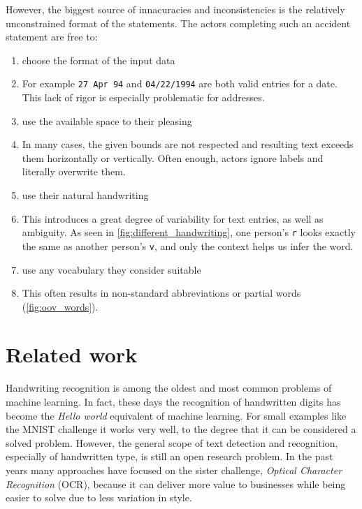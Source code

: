 	However, the biggest source of innacuracies and inconsistencies is the relatively unconstrained format of the statements. The actors completing such an accident statement are free to:
	\begin{enumerate}
		\item choose the format of the input data
		\item[] For example \texttt{27 Apr 94} and \texttt{04/22/1994} are both valid entries for a date. This lack of rigor is especially problematic for addresses.

		\item use the available space to their pleasing
		\item[] In many cases, the given bounds are not respected and resulting text exceeds them horizontally or vertically. Often enough, actors ignore labels and literally overwrite them.

		\item{use their natural handwriting \label{itm:natural_handwriting}}
		\item[] This introduces a great degree of variability for text entries, as well as ambiguity. As seen in \autoref{fig:different_handwriting}, one person's \texttt{r} looks exactly the same as another person's \texttt{v}, and only the context helps us infer the word.

		\item use any vocabulary they consider suitable
		\item[] This often results in non-standard abbreviations or partial words (\autoref{fig:oov_words}).
	\end{enumerate}




\section{Related work}
	Handwriting recognition is among the oldest and most common problems of machine learning. In fact, these days the recognition of handwritten digits has become the \textit{Hello world} equivalent of machine learning. For small examples like the MNIST challenge it works very well, to the degree that it can be considered a solved problem. However, the general scope of text detection and recognition, especially of handwritten type, is still an open research problem. In the past years many approaches have focused on the sister challenge, \emph{Optical Character Recognition} (OCR), because it can deliver more value to businesses while being easier to solve due to less variation in style.

